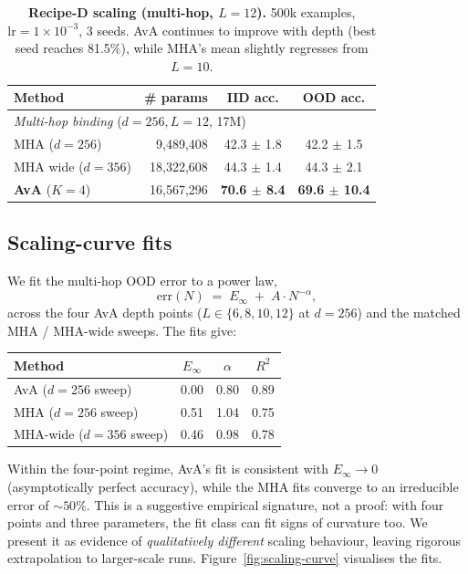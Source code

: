 \documentclass{article}
\begin{document}
\begin{table}[h]
\centering
\caption{\textbf{Recipe-D scaling (multi-hop, $L{=}12$).} 500k
examples, $\mathrm{lr}{=}1\!\times\!10^{-3}$, 3 seeds. AvA continues
to improve with depth (best seed reaches 81.5\%), while MHA's mean
slightly regresses from $L{=}10$.}
\label{tab:scaling-D}
\begin{tabular}{lrcc}
\toprule
Method & \# params & IID acc. & OOD acc. \\
\midrule
\multicolumn{4}{l}{\textit{Multi-hop binding} ($d{=}256, L{=}12$, 17M)} \\
\hspace{1em} MHA ($d{=}256$)            &  9,489,408 & 42.3 $\pm$ 1.8 & 42.2 $\pm$ 1.5 \\
\hspace{1em} MHA wide ($d{=}356$)       & 18,322,608 & 44.3 $\pm$ 1.4 & 44.3 $\pm$ 2.1 \\
\hspace{1em} \textbf{AvA} ($K{=}4$)     & 16,567,296 & \textbf{70.6 $\pm$ 8.4} & \textbf{69.6 $\pm$ 10.4} \\
\bottomrule
\end{tabular}
\end{table}

\subsection{Scaling-curve fits}
\label{sec:scaling-fits}

We fit the multi-hop OOD error to a power law,
\[
  \mathrm{err}(N) \;=\; E_\infty \;+\; A \cdot N^{-\alpha},
\]
across the four AvA depth points ($L \in \{6, 8, 10, 12\}$ at
$d{=}256$) and the matched MHA / MHA-wide sweeps. The fits give:

\begin{center}
\small
\begin{tabular}{lccc}
\toprule
Method                    & $E_\infty$ & $\alpha$ & $R^2$ \\
\midrule
AvA  ($d{=}256$ sweep)    & $\mathbf{0.00}$ & 0.80 & 0.89 \\
MHA  ($d{=}256$ sweep)    & 0.51           & 1.04 & 0.75 \\
MHA-wide ($d{=}356$ sweep) & 0.46           & 0.98 & 0.78 \\
\bottomrule
\end{tabular}
\end{center}

Within the four-point regime, AvA's fit is consistent with
$E_\infty \to 0$ (asymptotically perfect accuracy), while the MHA
fits converge to an irreducible error of $\sim 50\%$. This is a
suggestive empirical signature, not a proof: with four points and
three parameters, the fit class can fit signs of curvature too. We
present it as evidence of \emph{qualitatively different} scaling
behaviour, leaving rigorous extrapolation to larger-scale runs.
Figure~\ref{fig:scaling-curve} visualises the fits.
\end{document}
